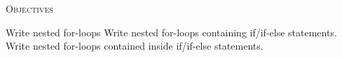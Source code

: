 


\renewcommand\TITLE{Assignment 9}
\usepackage{import}


\topmatter

\textsc{Objectives}
 \begin{myenum}
   \li Write nested for-loops
   \li Write nested for-loops containing if/if-else statements.
   \li Write nested for-loops contained inside if/if-else statements.
 \end{myenum}




